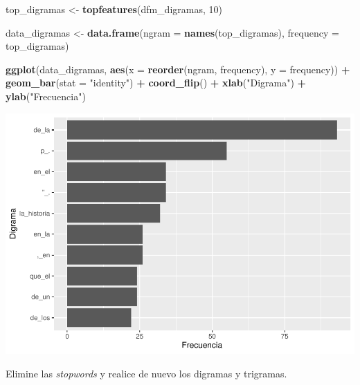\documentclass[
]{article}
\newenvironment{Shaded}{\begin{snugshade}}{\end{snugshade}}
\newcommand{\AttributeTok}[1]{\textcolor[rgb]{0.13,0.29,0.53}{#1}}
\newcommand{\DecValTok}[1]{\textcolor[rgb]{0.00,0.00,0.81}{#1}}
\newcommand{\FunctionTok}[1]{\textcolor[rgb]{0.13,0.29,0.53}{\textbf{#1}}}
\newcommand{\NormalTok}[1]{#1}
\newcommand{\OtherTok}[1]{\textcolor[rgb]{0.56,0.35,0.01}{#1}}
\newcommand{\SpecialCharTok}[1]{\textcolor[rgb]{0.81,0.36,0.00}{\textbf{#1}}}
\newcommand{\StringTok}[1]{\textcolor[rgb]{0.31,0.60,0.02}{#1}}
\begin{document}
\begin{Shaded}
\begin{Highlighting}[]
\NormalTok{top\_digramas }\OtherTok{\textless{}{-}} \FunctionTok{topfeatures}\NormalTok{(dfm\_digramas, }\DecValTok{10}\NormalTok{) }

\NormalTok{data\_digramas }\OtherTok{\textless{}{-}} \FunctionTok{data.frame}\NormalTok{(}\AttributeTok{ngram =} \FunctionTok{names}\NormalTok{(top\_digramas), }\AttributeTok{frequency =}\NormalTok{ top\_digramas)}

\FunctionTok{ggplot}\NormalTok{(data\_digramas, }\FunctionTok{aes}\NormalTok{(}\AttributeTok{x =} \FunctionTok{reorder}\NormalTok{(ngram, frequency), }\AttributeTok{y =}\NormalTok{ frequency)) }\SpecialCharTok{+}
    \FunctionTok{geom\_bar}\NormalTok{(}\AttributeTok{stat =} \StringTok{"identity"}\NormalTok{) }\SpecialCharTok{+}
    \FunctionTok{coord\_flip}\NormalTok{() }\SpecialCharTok{+}
    \FunctionTok{xlab}\NormalTok{(}\StringTok{"Digrama"}\NormalTok{) }\SpecialCharTok{+}
    \FunctionTok{ylab}\NormalTok{(}\StringTok{"Frecuencia"}\NormalTok{)}
\end{Highlighting}
\end{Shaded}

\includegraphics{Mineria_de_Texto_files/figure-latex/unnamed-chunk-26-1.pdf}

Elimine las \emph{stopwords} y realice de nuevo los digramas y
trigramas.
\end{document}
